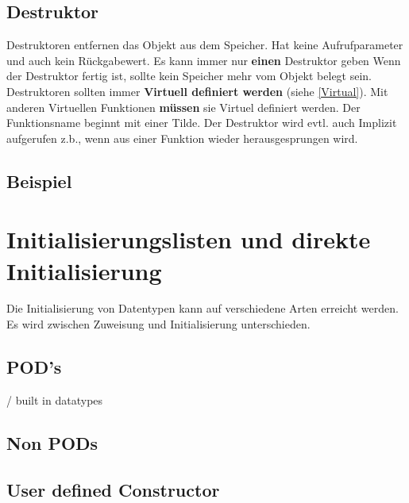 \subsection{Destruktor}

Destruktoren entfernen das Objekt aus dem Speicher. 
Hat keine Aufrufparameter und auch kein Rückgabewert. 
Es kann immer nur \textbf{einen} Destruktor geben
Wenn der Destruktor fertig ist, sollte kein Speicher mehr vom Objekt belegt sein.\\
Destruktoren sollten immer \textbf{Virtuell definiert werden} (siehe \ref{Virtual}). 
Mit anderen Virtuellen Funktionen \textbf{müssen} sie Virtuel definiert werden. 
Der Funktionsname beginnt mit einer Tilde. 
Der Destruktor wird evtl. auch Implizit aufgerufen z.b., wenn aus einer Funktion wieder herausgesprungen wird. 

\subsection{Beispiel}



\section{Initialisierungslisten und direkte Initialisierung}

Die Initialisierung von Datentypen kann auf verschiedene Arten erreicht werden. 
Es wird zwischen Zuweisung und Initialisierung unterschieden.

\subsection{POD's}

 / built in datatypes



\subsection{Non PODs}



\nextcol

\subsection{User defined Constructor}

